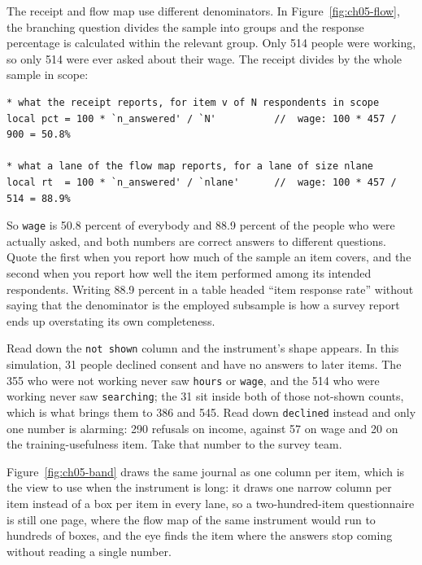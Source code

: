 \documentclass[
    a4paper,
    fontsize=10pt,
    twoside=true,
    numbers=noenddot,
]{kaobook}
\begin{document}
The receipt and flow map use different denominators. In Figure~\ref{fig:ch05-flow}, the branching question divides the sample into groups and the response percentage is calculated within the relevant group. Only 514 people were working, so only 514 were ever asked about their wage. The receipt divides by the whole sample in scope:
\par
{\footnotesize
\begin{verbatim}
* what the receipt reports, for item v of N respondents in scope
local pct = 100 * `n_answered' / `N'          //  wage: 100 * 457 / 900 = 50.8%

* what a lane of the flow map reports, for a lane of size nlane
local rt  = 100 * `n_answered' / `nlane'      //  wage: 100 * 457 / 514 = 88.9%
\end{verbatim}
}
So \texttt{wage} is 50.8 percent of everybody and 88.9 percent of the people who were actually asked, and both numbers are correct answers to different questions. Quote the first when you report how much of the sample an item covers, and the second when you report how well the item performed among its intended respondents. Writing 88.9 percent in a table headed \enquote{item response rate} without saying that the denominator is the employed subsample is how a survey report ends up overstating its own completeness.

Read down the \texttt{not shown} column and the instrument's shape appears. In this simulation, 31 people declined consent and have no answers to later items. The 355 who were not working never saw \texttt{hours} or \texttt{wage}, and the 514 who were working never saw \texttt{searching}; the 31 sit inside both of those not-shown counts, which is what brings them to 386 and 545. Read down \texttt{declined} instead and only one number is alarming: 290 refusals on income, against 57 on wage and 20 on the training-usefulness item. Take that number to the survey team.

Figure~\ref{fig:ch05-band} draws the same journal as one column per item, which is the view to use when the instrument is long: it draws one narrow column per item instead of a box per item in every lane, so a two-hundred-item questionnaire is still one page, where the flow map of the same instrument would run to hundreds of boxes, and the eye finds the item where the answers stop coming without reading a single number.
\end{document}
